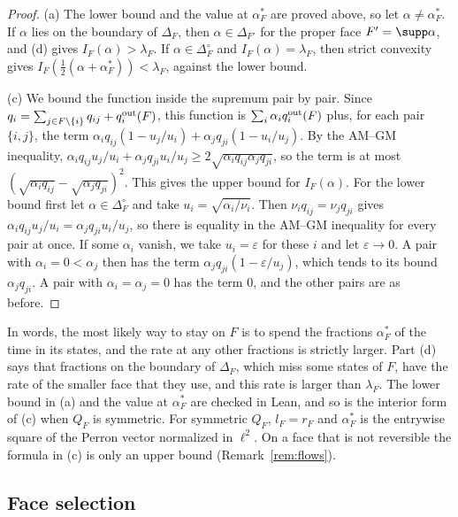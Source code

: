 \begin{proof}
(a) The lower bound and the value at $\alpha^*_F$ are proved above, so let
$\alpha\ne\alpha^*_F$. If $\alpha$ lies on the boundary of $\Delta_F$, then
$\alpha\in\Delta_{F'}$ for the proper face $F'=\supp\alpha$, and (d) gives
$I_F(\alpha)>\lambda_F$. If $\alpha\in\Delta_F^\circ$ and
$I_F(\alpha)=\lambda_F$, then strict convexity gives
$I_F(\frac12(\alpha+\alpha^*_F))<\lambda_F$, against the lower bound.

(c) We bound the function inside the supremum pair by pair. Since
$q_i=\sum_{j\in F\setminus\{i\}}q_{ij}+q_i^{\rm out}(F)$, this function is
$\sum_i\alpha_iq_i^{\rm out}(F)$ plus, for each pair $\{i,j\}$, the term
$\alpha_iq_{ij}(1-u_j/u_i)+\alpha_jq_{ji}(1-u_i/u_j)$. By the AM--GM
inequality,
$\alpha_iq_{ij}u_j/u_i+\alpha_jq_{ji}u_i/u_j\ge2\sqrt{\alpha_iq_{ij}\alpha_jq_{ji}}$,
so the term is at most $(\sqrt{\alpha_iq_{ij}}-\sqrt{\alpha_jq_{ji}})^2$. This
gives the upper bound for $I_F(\alpha)$. For the lower bound first let
$\alpha\in\Delta_F^\circ$ and take $u_i=\sqrt{\alpha_i/\nu_i}$. Then
$\nu_iq_{ij}=\nu_jq_{ji}$ gives
$\alpha_iq_{ij}u_j/u_i=\alpha_jq_{ji}u_i/u_j$, so there is equality in the
AM--GM inequality for every pair at once. If some $\alpha_i$ vanish, we take
$u_i=\varepsilon$ for these $i$ and let $\varepsilon\to0$. A pair with
$\alpha_i=0<\alpha_j$ then has the term $\alpha_jq_{ji}(1-\varepsilon/u_j)$,
which tends to its bound $\alpha_jq_{ji}$. A pair with
$\alpha_i=\alpha_j=0$ has the term $0$, and the other pairs are as before.
\end{proof}

In words, the most likely way to stay on $F$ is to spend the fractions
$\alpha^*_F$ of the time in its states, and the rate at any other fractions is
strictly larger. Part (d) says that fractions on the boundary of $\Delta_F$,
which miss some states of $F$, have the rate of the smaller face that they
use, and this rate is larger than $\lambda_F$. The lower
bound in (a) and the value at $\alpha^*_F$ are checked in Lean, and so is the
interior form of (c) when $Q_F$ is symmetric. For symmetric $Q_F$, $l_F=r_F$ and $\alpha^*_F$ is the entrywise square
of the Perron vector normalized in $\ell^2$. On a face that is not reversible the formula in (c)
is only an upper bound (Remark~\ref{rem:flows}).

\subsection{Face selection}

